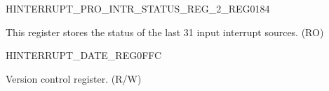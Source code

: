 \begin{register}{H}{INTERRUPT\_PRO\_INTR\_STATUS\_REG\_2\_REG}{\hexprefix{}0184}\label{regdesc:INTERRUPTPROINTRSTATUSREG2REG}
%
\regnewline%
\begin{regdesc}\begin{reglist}
\label{fielddesc:INTERRUPTPROINTRSTATUS2}\item [INTERRUPT\_PRO\_INTR\_STATUS\_2] This register stores the status of the last 31 input interrupt sources. (RO)
\end{reglist}\end{regdesc}
\end{register}


\begin{register}{H}{INTERRUPT\_DATE\_REG}{\hexprefix{}0FFC}\label{regdesc:INTERRUPTREGDATEREG}
%
%
\regnewline%
\begin{regdesc}\begin{reglist}
\label{fielddesc:INTERRUPTINTERRUPTREGDATE}\item [INTERRUPT\_DATE] Version control register. (R/W)
\end{reglist}\end{regdesc}
\end{register}
